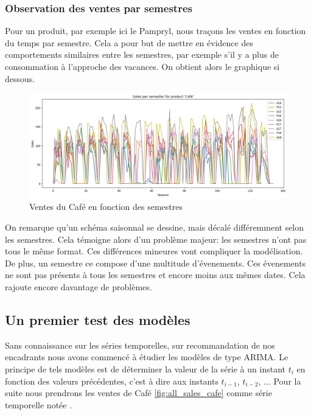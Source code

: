 \subsubsection{Observation des ventes par semestres}

Pour un produit, par exemple ici le Pampryl, nous traçons les ventes en fonction du temps par semestre. Cela a pour but de mettre en évidence des comportements similaires entre les semestres, par exemple s'il y a plus de consommation à l'approche des vacances. On obtient alors le graphique si dessous.

\begin{figure}[H]
	\centering
	\includegraphics[width=\textwidth]{figures/sales_per_semester_cafe.png}
	\caption{Ventes du Café en fonction des semestres}
    \label{fig:sales_per_semester_cafe}
\end{figure}

On remarque qu'un schéma saisonnal se dessine, mais décalé différemment selon les semestres. Cela témoigne alors d'un problème majeur: les semestres n'ont pas tous le même format. Ces différences mineures vont compliquer la modélisation.
De plus, un semestre ce compose d'une multitude d'évenements. Ces évenements ne sont pas présents à tous les semestres et encore moins aux mêmes dates. Cela rajoute encore davantage de problèmes.


\subsection{Un premier test des modèles \ARIMA}
\label{subsec:arima}

Sans connaissance sur les séries temporelles, sur recommandation de nos encadrants nous avons commencé à étudier les modèles de type ARIMA. Le principe de tels modèles est de déterminer la valeur de la série à un instant $t_i$ en fonction des valeurs précédentes, c'est à dire aux instants $t_{i-1}$, $t_{i-2}$, ... Pour la suite nous prendrons les ventes de Café \ref{fig:all_sales_cafe} comme série temporelle notée \ts.


